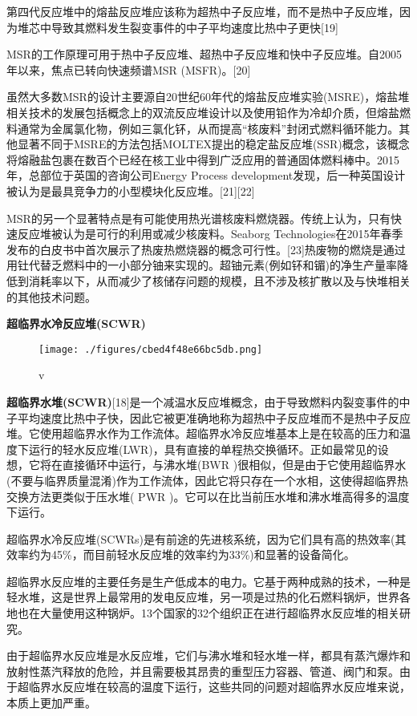 第四代反应堆中的熔盐反应堆应该称为超热中子反应堆，而不是热中子反应堆，因为堆芯中导致其燃料发生裂变事件的中子平均速度比热中子更快[19]

MSR的工作原理可用于热中子反应堆、超热中子反应堆和快中子反应堆。自2005年以来，焦点已转向快速频谱MSR (MSFR)。[20]

虽然大多数MSR的设计主要源自20世纪60年代的熔盐反应堆实验(MSRE)，熔盐堆相关技术的发展包括概念上的双流反应堆设计以及使用铅作为冷却介质，但熔盐燃料通常为金属氯化物，例如三氯化钚，从而提高“核废料”封闭式燃料循环能力。其他显著不同于MSRE的方法包括MOLTEX提出的稳定盐反应堆(SSR)概念，该概念将熔融盐包裹在数百个已经在核工业中得到广泛应用的普通固体燃料棒中。2015年，总部位于英国的咨询公司Energy Process development发现，后一种英国设计被认为是最具竞争力的小型模块化反应堆。[21][22]

MSR的另一个显著特点是有可能使用热光谱核废料燃烧器。传统上认为，只有快速反应堆被认为是可行的利用或减少核废料。Seaborg Technologies在2015年春季发布的白皮书中首次展示了热废热燃烧器的概念可行性。[23]热废物的燃烧是通过用钍代替乏燃料中的一小部分铀来实现的。超铀元素(例如钚和镅)的净生产量率降低到消耗率以下，从而减少了核储存问题的规模，且不涉及核扩散以及与快堆相关的其他技术问题。

\textbf{超临界水冷反应堆(SCWR)}

\begin{figure}[ht]
\centering
\texttt{[image: ./figures/cbed4f48e66bc5db.png]}
\caption{v} \label{fig_FYD_3}
\end{figure}

\textbf{超临界水堆(SCWR)}[18]是一个减温水反应堆概念，由于导致燃料内裂变事件的中子平均速度比热中子快，因此它被更准确地称为超热中子反应堆而不是热中子反应堆。它使用超临界水作为工作流体。超临界水冷反应堆基本上是在较高的压力和温度下运行的轻水反应堆(LWR)，具有直接的单程热交换循环。正如最常见的设想，它将在直接循环中运行，与沸水堆(BWR )很相似，但是由于它使用超临界水(不要与临界质量混淆)作为工作流体，因此它将只存在一个水相，这使得超临界热交换方法更类似于压水堆( PWR )。它可以在比当前压水堆和沸水堆高得多的温度下运行。

超临界水冷反应堆(SCWRs)是有前途的先进核系统，因为它们具有高的热效率(其效率约为45\%，而目前轻水反应堆的效率约为33\%)和显著的设备简化。

超临界水反应堆的主要任务是生产低成本的电力。它基于两种成熟的技术，一种是轻水堆，这是世界上最常用的发电反应堆，另一项是过热的化石燃料锅炉，世界各地也在大量使用这种锅炉。13个国家的32个组织正在进行超临界水反应堆的相关研究。

由于超临界水反应堆是水反应堆，它们与沸水堆和轻水堆一样，都具有蒸汽爆炸和放射性蒸汽释放的危险，并且需要极其昂贵的重型压力容器、管道、阀门和泵。由于超临界水反应堆在较高的温度下运行，这些共同的问题对超临界水反应堆来说，本质上更加严重。

